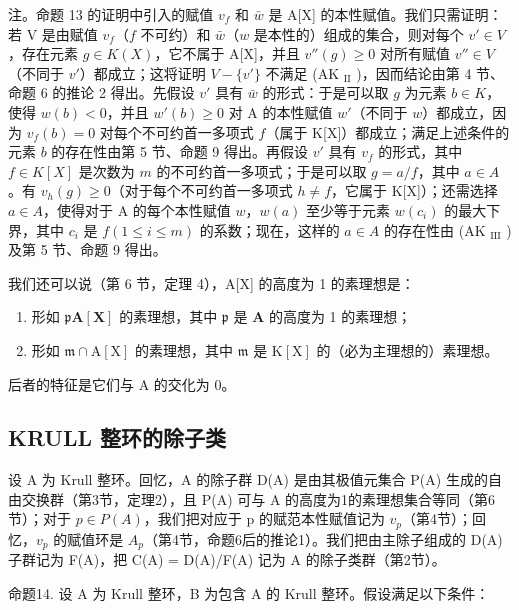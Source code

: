 注。命题 13 的证明中引入的赋值 \(v_f\) 和 \(\bar{w}\) 是 A{[}X{]} 的本性赋值。我们只需证明：若 V 是由赋值 \(v_f\)（\(f\) 不可约）和 \(\bar{w}\)（\(w\) 是本性的）组成的集合，则对每个 \(v' \in V\)，存在元素 \(g \in K(X)\)，它不属于 A{[}X{]}，并且 \(v''(g) \geqslant 0\) 对所有赋值 \(v'' \in V\)（不同于 \(v'\)）都成立；这将证明 \(V - \{v'\}\) 不满足 (AK \(_{\text{II}}\) )，因而结论由第 4 节、命题 6 的推论 2 得出。先假设 \(v'\) 具有 \(\bar{w}\) 的形式：于是可以取 \(g\) 为元素 \(b \in K\)，使得 \(w(b) < 0\)，并且 \(w'(b) \geqslant 0\) 对 A 的本性赋值 \(w'\)（不同于 \(w\)）都成立，因为 \(v_f(b) = 0\) 对每个不可约首一多项式 \(f\)（属于 K{[}X{]}）都成立；满足上述条件的元素 \(b\) 的存在性由第 5 节、命题 9 得出。再假设 \(v'\) 具有 \(v_f\) 的形式，其中 \(f \in K[X]\) 是次数为 \(m\) 的不可约首一多项式；于是可以取 \(g = a/f\)，其中 \(a \in A\)。有 \(v_h(g) \geqslant 0\)（对于每个不可约首一多项式 \(h \neq f\)，它属于 K{[}X{]}）；还需选择 \(a \in A\)，使得对于 A 的每个本性赋值 \(w\)，\(w(a)\) 至少等于元素 \(w(c_i)\) 的最大下界，其中 \(c_i\) 是 \(f (1 \leqslant i \leqslant m)\) 的系数；现在，这样的 \(a \in A\) 的存在性由 (AK \(_{\text{III}}\) ) 及第 5 节、命题 9 得出。

我们还可以说（第 6 节，定理 4），A{[}X{]} 的高度为 1 的素理想是：

\begin{enumerate}
\def\labelenumi{(\arabic{enumi})}
\item
  形如 \(\mathfrak{p}\mathbf{A}[\mathbf{X}]\) 的素理想，其中 \(\mathfrak{p}\) 是 \(\mathbf{A}\) 的高度为 1 的素理想；
\item
  形如 \(\mathfrak{m} \cap \mathrm{A}[\mathrm{X}]\) 的素理想，其中 \(\mathfrak{m}\) 是 \(\mathrm{K}[\mathrm{X}]\) 的（必为主理想的）素理想。
\end{enumerate}

后者的特征是它们与 A 的交化为 0。

\subsection{KRULL 整环的除子类}

设 A 为 Krull 整环。回忆，A 的除子群 D(A) 是由其极值元集合 P(A) 生成的自由交换群（第3节，定理2），且 P(A) 可与 A 的高度为1的素理想集合等同（第6节）；对于 \(p \in P(A)\)，我们把对应于 p 的赋范本性赋值记为 \(v_{p}\)（第4节）；回忆，\(v_{p}\) 的赋值环是 \(A_{p}\)（第4节，命题6后的推论1）。我们把由主除子组成的 D(A) 子群记为 F(A)，把 C(A) = D(A)/F(A) 记为 A 的除子类群（第2节）。

命题14. 设 A 为 Krull 整环，B 为包含 A 的 Krull 整环。假设满足以下条件：

